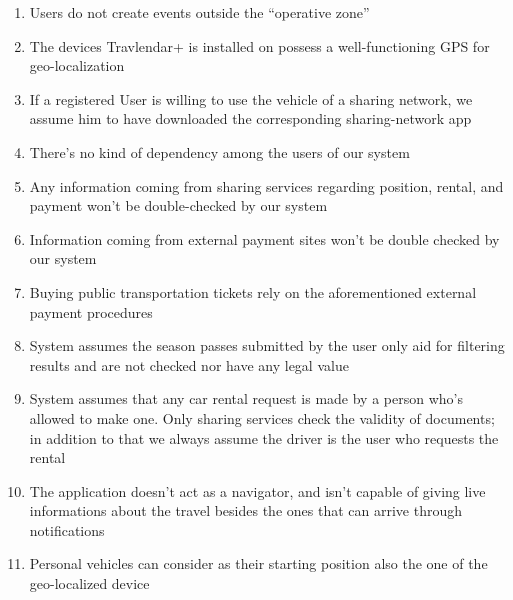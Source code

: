 	\begin{enumerate}
		
			\item Users do not create events outside the “operative zone”

			\item The devices Travlendar+ is installed on possess a well-functioning GPS for geo-localization

			\item If a registered User is willing to use the vehicle of a sharing network, we assume him to have downloaded the corresponding sharing-network app

			\item There’s no kind of dependency among the users of our system

			\item Any information coming from sharing services regarding position, rental, and payment won’t be double-checked by our system

			\item Information coming from external payment sites won’t be double checked by our system

			\item Buying public transportation tickets rely on the aforementioned external payment procedures

			\item System assumes the season passes submitted by the user only aid for filtering results and are not checked nor have any legal value

			\item System assumes that any car rental request is made by a person who’s allowed to make one. Only sharing services check the validity of documents; in addition to that we always assume the driver is the user who requests the rental

			\item The application doesn't act as a navigator, and isn't capable of giving live informations about the travel besides the ones that can arrive through notifications
			
			\item Personal vehicles can consider as their starting position also the one of the geo-localized device
			
		\end{enumerate}

